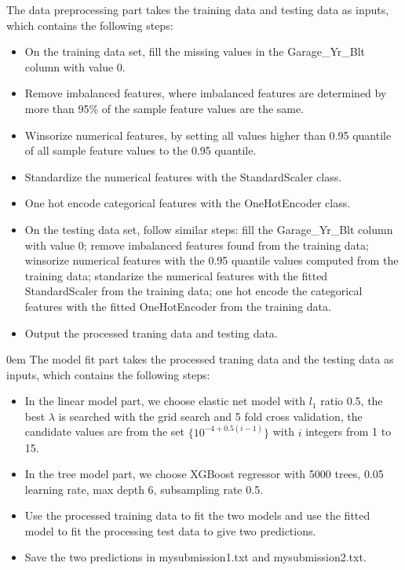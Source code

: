 \documentclass[12pt]{article}
\theoremstyle{plain}
\begin{document}
The data preprocessing part takes the training data and testing data as inputs, which contains the following steps:
\begin{itemize}
\itemsep0em
\item On the training data set, fill the missing values in the Garage\_Yr\_Blt column with value 0.
\item Remove imbalanced features, where imbalanced features are determined by more than 95\% of the sample feature values are the same.
\item Winsorize numerical features, by setting all values higher than 0.95 quantile of all sample feature values to the 0.95 quantile.
\item Standardize the numerical features with the StandardScaler class.
\item One hot encode categorical features with the OneHotEncoder class.
\item On the testing data set, follow similar steps: fill the Garage\_Yr\_Blt column with value 0; remove imbalanced features found from the training data; winsorize numerical features with the 0.95 quantile values computed from the training data; standarize the numerical features with the fitted StandardScaler from the training data; one hot encode the categorical features with the fitted OneHotEncoder from the training data.
\item Output the processed traning data and testing data.
\end{itemize}
\itemsep0em
The model fit part takes the processed traning data and the testing data as inputs, which contains the following steps:
\begin{itemize}
\item In the linear model part, we choose elastic net model with $l_1$ ratio 0.5, the best $\lambda$ is searched with the grid search and 5 fold cross validation, the candidate values are from the set $\lbrace 10^{-4+0.5(i-1)}\rbrace$ with $i$ integers from 1 to 15.
\item In the tree model part, we choose XGBoost regressor with 5000 trees, 0.05 learning rate, max depth 6, subsampling rate 0.5. 
\item Use the processed training data to fit the two models and use the fitted model to fit the processing test data to give two predictions.
\item Save the two predictions in mysubmission1.txt and mysubmission2.txt.
\end{itemize} 
\end{document}
